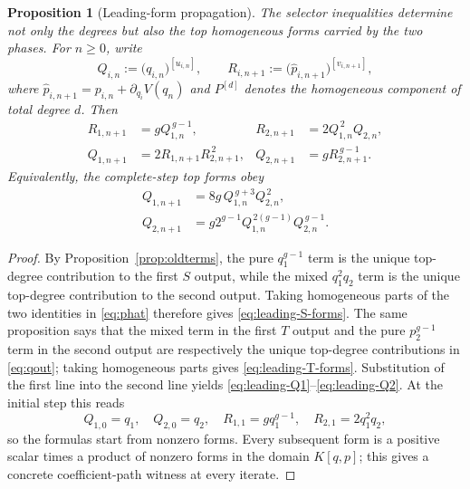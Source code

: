 \documentclass[11pt]{article}
\newtheorem{proposition}[theorem]{Proposition}
\theoremstyle{remark}
\numberwithin{equation}{section}
\begin{document}
\begin{proposition}[Leading-form propagation]\label{prop:leadingforms}
The selector inequalities determine not only the degrees but also the top
homogeneous forms carried by the two phases.  For $n\geq0$, write
\[
 Q_{i,n}:=\bigl(q_{i,n}\bigr)^{[u_{i,n}]},\qquad
 R_{i,n+1}:=\bigl(\widehat p_{i,n+1}\bigr)^{[v_{i,n+1}]},
\]
where
\(
 \widehat p_{i,n+1}=p_{i,n}+\partial_{q_i}V(q_n)
\)
and $P^{[d]}$ denotes the homogeneous component of total degree $d$.
Then
\begin{align}
 R_{1,n+1}&=gQ_{1,n}^{\,g-1},
 &R_{2,n+1}&=2Q_{1,n}^{\,2}Q_{2,n},\label{eq:leading-S-forms}\\
 Q_{1,n+1}&=2R_{1,n+1}R_{2,n+1}^{\,2},
 &Q_{2,n+1}&=gR_{2,n+1}^{\,g-1}.
 \label{eq:leading-T-forms}
\end{align}
Equivalently, the complete-step top forms obey
\begin{align}
 Q_{1,n+1}&=8g\,Q_{1,n}^{\,g+3}Q_{2,n}^{\,2},\label{eq:leading-Q1}\\
 Q_{2,n+1}&=g2^{g-1}Q_{1,n}^{\,2(g-1)}Q_{2,n}^{\,g-1}.
 \label{eq:leading-Q2}
\end{align}
\end{proposition}

\begin{proof}
By Proposition~\ref{prop:oldterms}, the pure $q_1^{g-1}$ term is the
unique top-degree contribution to the first $S$ output, while the mixed
$q_1^2q_2$ term is the unique top-degree contribution to the second output.
Taking homogeneous parts of the two identities in
\eqref{eq:phat} therefore gives \eqref{eq:leading-S-forms}.  The same
proposition says that the mixed term in the first $T$ output and the pure
$p_2^{g-1}$ term in the second output are respectively the unique top-degree
contributions in \eqref{eq:qout}; taking homogeneous parts gives
\eqref{eq:leading-T-forms}.  Substitution of the first line into the second
line yields \eqref{eq:leading-Q1}--\eqref{eq:leading-Q2}.  At the initial
step this reads
\[
 Q_{1,0}=q_1,\quad Q_{2,0}=q_2,\quad
 R_{1,1}=gq_1^{g-1},\quad R_{2,1}=2q_1^2q_2,
\]
so the formulas start from nonzero forms.  Every subsequent form is a
positive scalar times a product of nonzero forms in the domain $K[q,p]$;
this gives a concrete coefficient-path witness at every iterate.
\end{proof}
\end{document}
